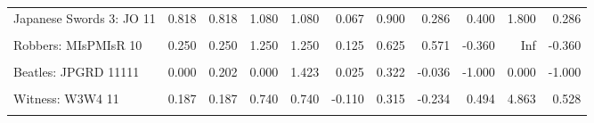 \documentclass[
  10pt,
]{scrartcl}
\begin{document}
\begin{table}[H]
{\begin{tabular}[t]{lrrrrrrrrrr}
Japanese Swords 3: JO 11 & 0.818 & 0.818 & 1.080 & 1.080 & 0.067 & 0.900 & 0.286 & 0.400 & 1.800 & 0.286\\
\cellcolor{gray!6}{Robbers: MIsPMIsR 11} & \cellcolor{gray!6}{0.600} & \cellcolor{gray!6}{0.600} & \cellcolor{gray!6}{0.937} & \cellcolor{gray!6}{0.937} & \cellcolor{gray!6}{-0.050} & \cellcolor{gray!6}{0.750} & \cellcolor{gray!6}{-0.143} & \cellcolor{gray!6}{0.600} & \cellcolor{gray!6}{Inf} & \cellcolor{gray!6}{0.600}\\
Robbers: MIsPMIsR 10 & 0.250 & 0.250 & 1.250 & 1.250 & 0.125 & 0.625 & 0.571 & -0.360 & Inf & -0.360\\
\cellcolor{gray!6}{Robbers: MIsPMIsR 01} & \cellcolor{gray!6}{0.250} & \cellcolor{gray!6}{0.250} & \cellcolor{gray!6}{1.250} & \cellcolor{gray!6}{1.250} & \cellcolor{gray!6}{0.125} & \cellcolor{gray!6}{0.625} & \cellcolor{gray!6}{0.571} & \cellcolor{gray!6}{-0.360} & \cellcolor{gray!6}{Inf} & \cellcolor{gray!6}{-0.360}\\
Beatles: JPGRD 11111 & 0.000 & 0.202 & 0.000 & 1.423 & 0.025 & 0.322 & -0.036 & -1.000 & 0.000 & -1.000\\
\cellcolor{gray!6}{Witness: W1W2 11} & \cellcolor{gray!6}{0.451} & \cellcolor{gray!6}{0.451} & \cellcolor{gray!6}{3.551} & \cellcolor{gray!6}{3.551} & \cellcolor{gray!6}{0.446} & \cellcolor{gray!6}{0.621} & \cellcolor{gray!6}{0.771} & \cellcolor{gray!6}{0.729} & \cellcolor{gray!6}{18.501} & \cellcolor{gray!6}{0.871}\\
Witness: W3W4 11 & 0.187 & 0.187 & 0.740 & 0.740 & -0.110 & 0.315 & -0.234 & 0.494 & 4.863 & 0.528\\
\cellcolor{gray!6}{Witness: W4W5 11} & \cellcolor{gray!6}{0.365} & \cellcolor{gray!6}{0.365} & \cellcolor{gray!6}{1.260} & \cellcolor{gray!6}{1.260} & \cellcolor{gray!6}{0.110} & \cellcolor{gray!6}{0.535} & \cellcolor{gray!6}{0.218} & \cellcolor{gray!6}{0.602} & \cellcolor{gray!6}{5.236} & \cellcolor{gray!6}{0.637}\\
\bottomrule
\end{tabular}}
\end{table}
\end{document}
